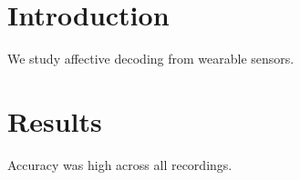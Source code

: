 \documentclass{article}
\begin{document}
\section{Introduction}
We study affective decoding from wearable sensors.
\section{Results}
Accuracy was high across all recordings.
\end{document}
